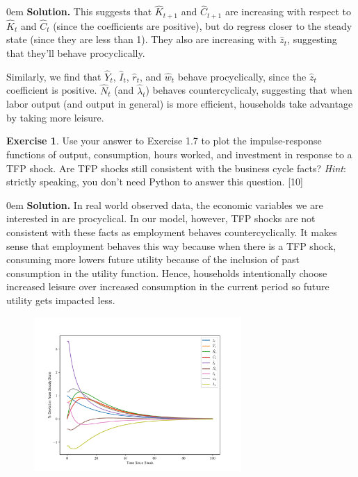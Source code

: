 \documentclass[11pt]{article}
\numberwithin{equation}{section} %
\numberwithin{figure}{section} %
\numberwithin{table}{section} %
\theoremstyle{definition}
\newtheorem{exercise}[theorem]{Exercise}
\newenvironment{solution}{\begin{addmargin}[2em]{0em} {\bf Solution. }}{\end{addmargin}}
\begin{document}
\begin{solution}
    This suggests that $\hat{K}_{t+1}$ and $\hat{C}_{t+1}$ are increasing with respect to $\hat{K}_t$ and $\hat{C}_t$ (since the coefficients are positive), but do regress closer to the steady state (since they are less than 1). They also are increasing with $\hat{z}_t$, suggesting that they'll behave procyclically.

    Similarly, we find that $\hat{Y}_t$, $\hat{I}_t$, $\hat{r}_t$, and $\hat{w}_t$ behave procyclically, since the $\hat{z}_t$ coefficient is positive. $\hat{N}_t$ (and $\hat{\lambda}_t$) behaves countercyclicaly, suggesting that when labor output (and output in general) is more efficient, households take advantage by taking more leisure.
\end{solution}

\begin{exercise}
    Use your answer to Exercise 1.7 to plot the impulse-response functions of output, consumption, hours worked, and investment in response to a TFP shock. Are TFP shocks still consistent with the business cycle facts? \emph{Hint}: strictly speaking, you don't need Python to answer this question. [10]
\end{exercise}

\begin{solution}
    In real world observed data, the economic variables we are interested in are procyclical. In our model, however, TFP shocks are not consistent with these facts as employment behaves countercyclically. It makes sense that employment behaves this way because when there is a TFP shock, consuming more lowers future utility because of the inclusion of past consumption in the utility function. Hence, households intentionally choose increased leisure over increased consumption in the current period so future utility gets impacted less.

    \begin{figure}[H]
        \centering
        \includegraphics[width=0.7\textwidth]{./graphs/nu=0.85.pdf}
    \end{figure}
\end{solution}
\end{document}

